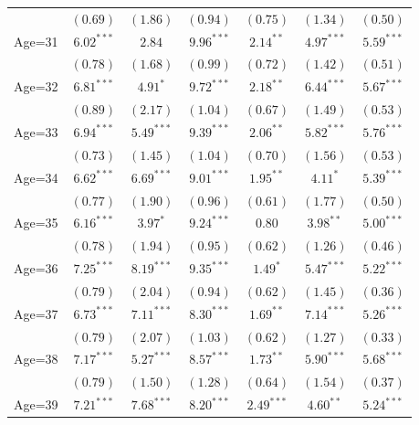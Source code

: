 \documentclass[fullpage]{paper}
\begin{document}
\begin{center}
\begin{longtable}{l c c c c c c }
            & $(0.69)$      & $(1.86)$      & $(0.94)$       & $(0.75)$      & $(1.34)$      & $(0.50)$      \\
Age=31      & $6.02^{***}$  & $2.84$        & $9.96^{***}$   & $2.14^{**}$   & $4.97^{***}$  & $5.59^{***}$  \\
            & $(0.78)$      & $(1.68)$      & $(0.99)$       & $(0.72)$      & $(1.42)$      & $(0.51)$      \\
Age=32      & $6.81^{***}$  & $4.91^{*}$    & $9.72^{***}$   & $2.18^{**}$   & $6.44^{***}$  & $5.67^{***}$  \\
            & $(0.89)$      & $(2.17)$      & $(1.04)$       & $(0.67)$      & $(1.49)$      & $(0.53)$      \\
Age=33      & $6.94^{***}$  & $5.49^{***}$  & $9.39^{***}$   & $2.06^{**}$   & $5.82^{***}$  & $5.76^{***}$  \\
            & $(0.73)$      & $(1.45)$      & $(1.04)$       & $(0.70)$      & $(1.56)$      & $(0.53)$      \\
Age=34      & $6.62^{***}$  & $6.69^{***}$  & $9.01^{***}$   & $1.95^{**}$   & $4.11^{*}$    & $5.39^{***}$  \\
            & $(0.77)$      & $(1.90)$      & $(0.96)$       & $(0.61)$      & $(1.77)$      & $(0.50)$      \\
Age=35      & $6.16^{***}$  & $3.97^{*}$    & $9.24^{***}$   & $0.80$        & $3.98^{**}$   & $5.00^{***}$  \\
            & $(0.78)$      & $(1.94)$      & $(0.95)$       & $(0.62)$      & $(1.26)$      & $(0.46)$      \\
Age=36      & $7.25^{***}$  & $8.19^{***}$  & $9.35^{***}$   & $1.49^{*}$    & $5.47^{***}$  & $5.22^{***}$  \\
            & $(0.79)$      & $(2.04)$      & $(0.94)$       & $(0.62)$      & $(1.45)$      & $(0.36)$      \\
Age=37      & $6.73^{***}$  & $7.11^{***}$  & $8.30^{***}$   & $1.69^{**}$   & $7.14^{***}$  & $5.26^{***}$  \\
            & $(0.79)$      & $(2.07)$      & $(1.03)$       & $(0.62)$      & $(1.27)$      & $(0.33)$      \\
Age=38      & $7.17^{***}$  & $5.27^{***}$  & $8.57^{***}$   & $1.73^{**}$   & $5.90^{***}$  & $5.68^{***}$  \\
            & $(0.79)$      & $(1.50)$      & $(1.28)$       & $(0.64)$      & $(1.54)$      & $(0.37)$      \\
Age=39      & $7.21^{***}$  & $7.68^{***}$  & $8.20^{***}$   & $2.49^{***}$  & $4.60^{**}$   & $5.24^{***}$  \\

\end{longtable}
\end{center}
\end{document}
